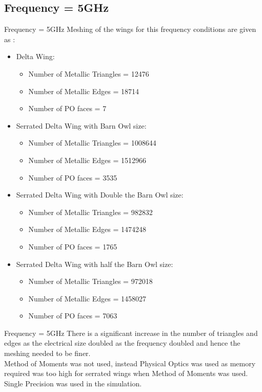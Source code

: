 \documentclass{beamer}
\begin{document}
\subsection{Frequency = 5GHz}
\begin{frame}{Frequency = 5GHz}
Meshing of the wings for this frequency conditions are given as :
\begin{itemize}
\item Delta Wing:
\begin{itemize}
	\item Number of Metallic Triangles = 12476
	\item Number of Metallic Edges = 18714
	\item Number of PO faces = 7
\end{itemize}
\item Serrated Delta Wing with Barn Owl size:
\begin{itemize}
\item Number of Metallic Triangles = 1008644
\item Number of Metallic Edges = 1512966
\item Number of PO faces = 3535
\end{itemize}
\item Serrated Delta Wing with Double the Barn Owl size:
\begin{itemize}
\item Number of Metallic Triangles = 982832
\item Number of Metallic Edges = 1474248
\item Number of PO faces = 1765
\end{itemize}
\item Serrated Delta Wing with half the Barn Owl size:
\begin{itemize}
\item Number of Metallic Triangles = 972018
\item Number of Metallic Edges = 1458027
\item Number of PO faces = 7063
\end{itemize}
\end{itemize}
\end{frame}

\begin{frame}{Frequency = 5GHz}
\justifying
There is a significant increase in the number of triangles and edges as the electrical size doubled as the frequency doubled and hence the meshing needed to be finer.\\[0.2in]
Method of Moments was not used, instead Physical Optics was used as memory required was too high for serrated wings when Method of Moments was used. Single Precision was used in the simulation.\\
\end{frame}
\end{document}
